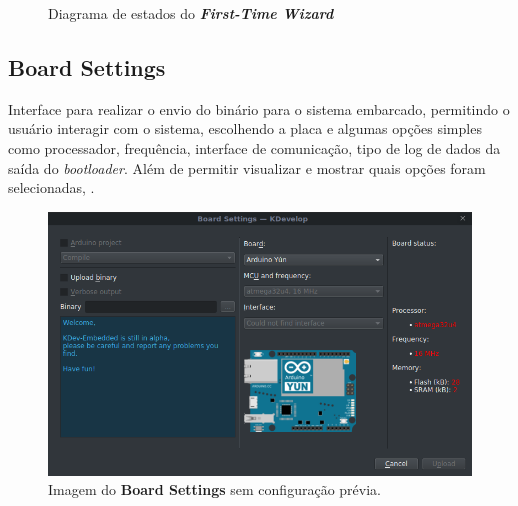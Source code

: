\begin{figure}[ht!]
  \centering
    \caption[Diagrama de estados do \textbf{\textit{First-Time Wizard}}]{\label{fig:ftwstate}}{Diagrama de estados do \textbf{\textit{First-Time Wizard}}}
\end{figure}


\subsection{Board Settings}

Interface para realizar o envio do binário para o sistema embarcado, permitindo o usuário interagir com o sistema, escolhendo a placa e algumas opções simples como processador, frequência, interface de comunicação, tipo de log de dados da saída do \textit{bootloader}. Além de permitir visualizar e mostrar quais opções foram selecionadas, .

\begin{figure}[!htb]
  \centering
  \caption[Board Settings com configuração inicial]{Imagem do \textbf{Board Settings} sem configuração prévia.}
  \label{fig:boardsettings}
  \includegraphics[width=1\textwidth]{figuras/boardsettings.png}
\end{figure}

